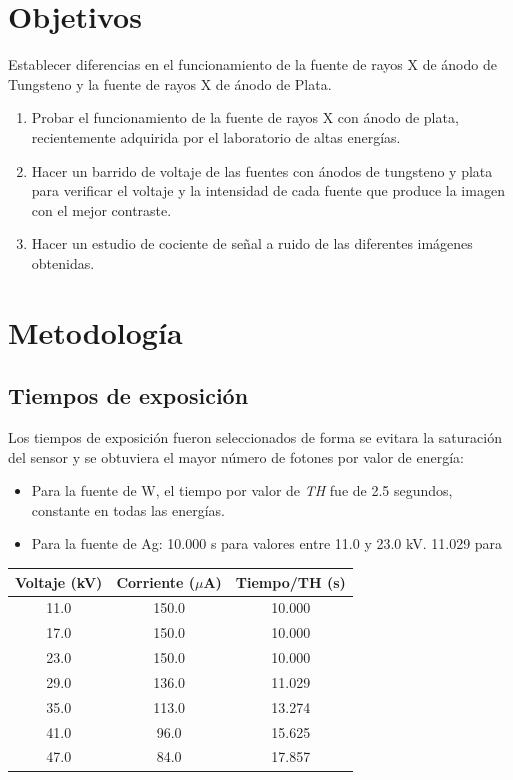 \documentclass{sciposter}
\begin{document}
\begin{multicols}{3}
\section{Objetivos}
	Establecer diferencias en el funcionamiento de la fuente de rayos X de ánodo de Tungsteno y la fuente de rayos X de ánodo de Plata.
	\begin{enumerate}
		\item Probar el funcionamiento de la fuente de rayos X con ánodo de plata, recientemente adquirida por el laboratorio de altas energías.
		
		\item Hacer un barrido de voltaje de las fuentes con ánodos de tungsteno y plata para verificar el voltaje y la intensidad de cada fuente que produce la imagen con el mejor contraste.
		
		\item Hacer un estudio de cociente de señal a ruido de las diferentes imágenes obtenidas.
	\end{enumerate}

\section{Metodología}	
	\subsection{Tiempos de exposición}
	Los tiempos de exposición fueron seleccionados de forma se evitara la saturación del sensor y se obtuviera el mayor número de fotones por valor de energía:
	\begin{itemize}
		\item Para la fuente de W, el tiempo por valor de \textit{TH} fue de 2.5 segundos, constante en todas las energías.
		\item Para la fuente de Ag: 10.000 s para valores entre 11.0 y 23.0 kV. 11.029 para 
	\end{itemize}
	
	\begin{table}[h]
		\centering
		\small
		\begin{tabular}{| c | c c |}
			\hline
			\textbf{Voltaje (kV)} & \textbf{Corriente ($\mu$A)} & \textbf{Tiempo/TH (s)} \\
			\hline
			11.0 & 150.0 & 10.000 \\
			17.0 & 150.0 & 10.000 \\
			23.0 & 150.0 & 10.000 \\
			29.0 & 136.0 & 11.029 \\
			35.0 & 113.0 & 13.274 \\
			41.0 & 96.0 & 15.625 \\
			47.0 & 84.0 & 17.857 \\
			\hline
		\end{tabular}
		\label{tab:corrientes}
	\end{table}
	

\end{multicols}
\end{document}
